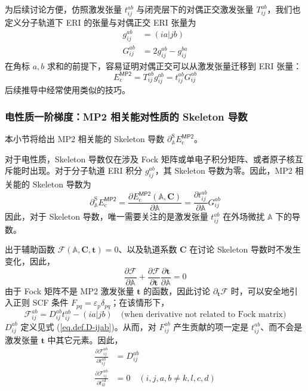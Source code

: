 为后续讨论方便，仿照激发张量 $t_{ij}^{ab}$ 与闭壳层下的对偶正交激发张量 $T_{ij}^{ab}$，我们也定义分子轨道下 ERI 的张量与对偶正交 ERI 张量为
\begin{align}
  g_{ij}^{ab} &= (ia|jb) \\
  G_{ij}^{ab} &= 2 g_{ij}^{ab} - g_{ij}^{ba}
\end{align}
在角标 $a, b$ 求和的前提下，容易证明对偶正交可以从激发张量迁移到 ERI 张量：
\begin{equation}
  E_\mathrm{c}^\textsf{MP2} = T_{ij}^{ab} g_{ij}^{ab} = t_{ij}^{ab} G_{ij}^{ab}
\end{equation}
后续推导中经常使用类似的技巧。

\subsubsection{电性质一阶梯度：MP2 相关能对性质的 Skeleton 导数}
\label{sec.3.skeleton}

本小节将给出 MP2 相关能的 Skeleton 导数 $\partial_\mathbb{A}^\mathrm{S} E_\mathrm{c}^\textsf{MP2}$。

对于电性质，Skeleton 导数仅在涉及 Fock 矩阵或单电子积分矩阵、或者原子核互斥能时出现。对于分子轨道 ERI 积分 $g_{ij}^{ab}$，其 Skeleton 导数为零。因此，MP2 相关能的 Skeleton 导数为
\begin{equation}
  \label{eq.pdSA-Ec-MP2-0}
  \partial_\mathbb{A}^\mathrm{S} E_\mathrm{c}^\textsf{MP2} = \frac{\partial E_\mathrm{c}^\textsf{MP2} (\mathbb{A}, \mathbf{C})}{\partial \mathbb{A}} = \frac{\partial t_{ij}^{ab}}{\partial \mathbb{A}} G_{ij}^{ab}
\end{equation}
因此，对于 Skeleton 导数，唯一需要关注的是激发张量 $t_{ij}^{ab}$ 在外场微扰 $\mathbb{A}$ 下的导数。

出于辅助函数 $\pmb{\mathscr{F}} (\mathbb{A}, \mathbf{C}, \mathbf{t}) = 0$、以及轨道系数 $\mathbf{C}$ 在讨论 Skeleton 导数时不发生变化，因此，
\begin{equation}
  \label{eq.auxfunc-pdA}
  \frac{\partial \pmb{\mathscr{F}}}{\partial \mathbb{A}} + \frac{\partial \pmb{\mathscr{F}}}{\partial \mathbf{t}} \frac{\partial \mathbf{t}}{\partial \mathbb{A}} = 0
\end{equation}
由于 Fock 矩阵不是 MP2 激发张量 $\mathbf{t}$ 的函数，因此讨论 $\partial_\mathbf{t} \pmb{\mathscr{F}}$ 时，可以安全地引入正则 SCF 条件 $F_{pq} = \varepsilon_p \delta_{pq}$；在该情形下，
\begin{equation*}
  \mathscr{F}_{ij}^{ab} = D_{ij}^{ab} t_{ij}^{ab} - (ia|jb) \quad \text{(when derivative not related to Fock matrix)}
\end{equation*}
$D_{ij}^{ab}$ 定义见式 (\ref{eq.def.D-ijab})。从而，对 $F_{ij}^{ab}$ 产生贡献的项一定是 $t_{ij}^{ab}$、而不会是激发张量 $\mathbf{t}$ 中其它元素。因此，
\begin{align}
  \label{eq.auxfunc-pdt}
  \frac{\partial \mathscr{F}_{ij}^{ab}}{\partial t_{ij}^{ab}} &= D_{ij}^{ab} \\
  \frac{\partial \mathscr{F}_{ij}^{ab}}{\partial t_{kl}^{cd}} &= 0 \quad (i,j,a,b \neq k,l,c,d)
\end{align}

